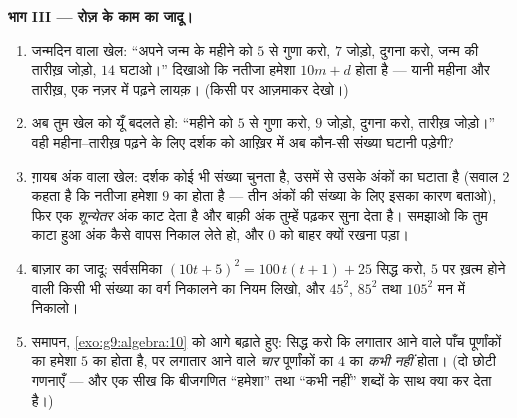 \begin{problem}
\medskip
\noindent\textbf{भाग III --- रोज़ के काम का जादू।}
\begin{enumerate}[resume]
  \item जन्मदिन वाला खेल: ``अपने जन्म के महीने को $5$ से गुणा करो,
        $7$ जोड़ो, दुगना करो, जन्म की तारीख़ जोड़ो, $14$ घटाओ।''
        दिखाओ कि नतीजा हमेशा $10m + d$ होता है --- यानी महीना और
        तारीख़, एक नज़र में पढ़ने लायक़। (किसी पर आज़माकर देखो।)
  \item अब तुम खेल को यूँ बदलते हो: ``महीने को $5$ से गुणा करो, $9$
        जोड़ो, दुगना करो, तारीख़ जोड़ो।'' वही महीना--तारीख़ पढ़ने के
        लिए दर्शक को आख़िर में अब कौन-सी संख्या घटानी पड़ेगी?
  \item ग़ायब अंक वाला खेल: दर्शक कोई भी संख्या चुनता है, उसमें से
        उसके अंकों का  घटाता है (सवाल 2 कहता है कि नतीजा हमेशा
        $9$ का  होता है --- तीन अंकों की संख्या के लिए इसका
        कारण बताओ), फिर एक \emph{शून्येतर} अंक काट देता है और बाक़ी
        अंक तुम्हें पढ़कर सुना देता है। समझाओ कि तुम काटा हुआ अंक
        कैसे वापस निकाल लेते हो, और $0$ को बाहर क्यों रखना पड़ा।
  \item बाज़ार का जादू: सर्वसमिका
        $(10t + 5)^2 = 100\,t(t+1) + 25$ सिद्ध करो, $5$ पर ख़त्म
        होने वाली किसी भी संख्या का वर्ग निकालने का नियम लिखो, और
        $45^2$, $85^2$ तथा $105^2$ मन में निकालो।
  \item समापन, \cref{exo:g9:algebra:10} को आगे बढ़ाते हुए: सिद्ध
        करो कि लगातार आने वाले पाँच पूर्णांकों का  हमेशा $5$
        का  होता है, पर लगातार आने वाले \emph{चार} पूर्णांकों
        का  $4$ का  \emph{कभी नहीं} होता। (दो छोटी गणनाएँ
        --- और एक सीख कि बीजगणित ``हमेशा'' तथा ``कभी नहीं'' शब्दों
        के साथ क्या कर देता है।)

\end{enumerate}
\end{problem}

